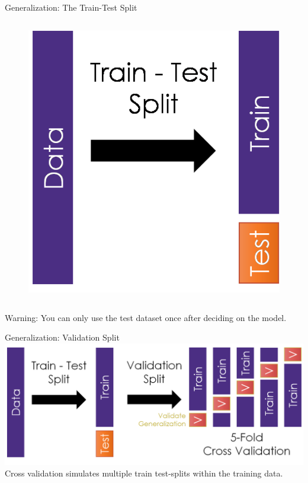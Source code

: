 \documentclass[aspectratio=169]{../latex_main/tntbeamer}  %
\begin{document}
\begin{frame}{Generalization: The Train-Test Split}
\begin{columns}
	        
	       \begin{column}{.5\textwidth}
	                \begin{figure}
	                    \includegraphics[scale=.5]{Bild3}
	                \end{figure}
	        \end{column}
	    \end{columns}
	    \bigskip
	    \alert{Warning:} You can only use the test dataset once after deciding on the model.

	\end{frame}
	
	\begin{frame}{Generalization: Validation Split}
	    \includegraphics[scale=.43]{Bild4}\\
	    Cross validation simulates multiple train test-splits within the training data.

	\end{frame}
	
\end{document}
